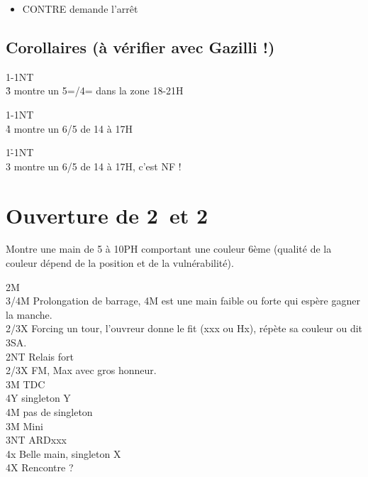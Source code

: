 \documentclass[a4paper]{article}
\begin{document}
\begin{itemize}
\item CONTRE demande l’arrêt

\end{itemize}

\subsection{Corollaires (à vérifier avec Gazilli !)}

\begin{bidtable}
1\s-1NT\\
3\h \> montre un 5=/4= dans la zone 18-21H
\end{bidtable}

\begin{bidtable}
1\s-1NT\\
4\h \> montre un 6/5 de 14 à 17H
\end{bidtable}

\begin{bidtable}
1\h-1NT\\
3\s \> montre un 6/5 de 14 à 17H, c’est NF !
\end{bidtable}

\section{Ouverture de 2\pdfh\ et 2\pdfs}

Montre une main de 5 à 10PH comportant une couleur 6ème (qualité de la couleur dépend de la position et de la vulnérabilité).

\begin{bidtable}
2M\+\\
3/4M \> Prolongation de barrage, 4M est une main faible ou forte qui espère gagner la manche.\\
2/3X \> Forcing un tour, l'ouvreur donne le fit (xxx ou Hx), répète sa couleur ou dit 3SA.\\
2NT \> Relais fort\+\\
2/3X \> FM, Max avec gros honneur.\+\\
3M \> TDC\+\\
4Y \> singleton Y\\
4M \> pas de singleton\-\-\\
3M \> Mini\\
3NT \> ARDxxx\\
4x \> Belle main, singleton X\-\\
4X \> Rencontre ?\-
\end{bidtable}
\end{document}
